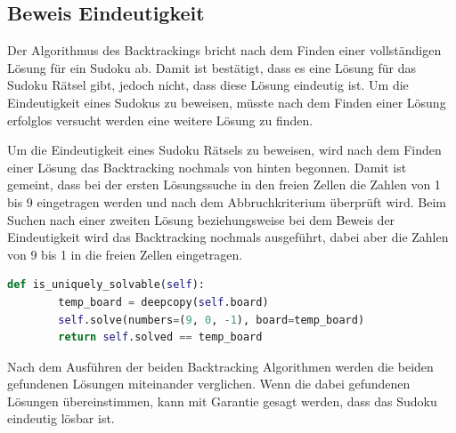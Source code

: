 \subsection{Beweis Eindeutigkeit}
Der Algorithmus des Backtrackings bricht nach dem Finden einer vollständigen Lösung für ein Sudoku ab. Damit ist bestätigt, dass es eine Lösung für das Sudoku Rätsel gibt, jedoch nicht, dass diese Lösung eindeutig ist. Um die Eindeutigkeit eines Sudokus zu beweisen, müsste nach dem Finden einer Lösung erfolglos versucht werden eine weitere Lösung zu finden.

Um die Eindeutigkeit eines Sudoku Rätsels zu beweisen, wird nach dem Finden einer Lösung das Backtracking nochmals von hinten begonnen. Damit ist gemeint, dass bei der ersten Lösungssuche in den freien Zellen die Zahlen von 1 bis 9 eingetragen werden und nach dem Abbruchkriterium überprüft wird. Beim Suchen nach einer zweiten Lösung beziehungsweise bei dem Beweis der Eindeutigkeit wird das Backtracking nochmals ausgeführt, dabei aber die Zahlen von 9 bis 1 in die freien Zellen eingetragen.

\begin{lstlisting}[language=Python, caption={Überprüfen ob ein Sudokurätsel eine eindeutige Lösung hat}, label={lst:uniquesolve}]
	def is_uniquely_solvable(self):
		temp_board = deepcopy(self.board)
		self.solve(numbers=(9, 0, -1), board=temp_board)
		return self.solved == temp_board
\end{lstlisting}

Nach dem Ausführen der beiden Backtracking Algorithmen werden die beiden gefundenen Lösungen miteinander verglichen. Wenn die dabei gefundenen Lösungen übereinstimmen, kann mit Garantie gesagt werden, dass das Sudoku eindeutig lösbar ist.

